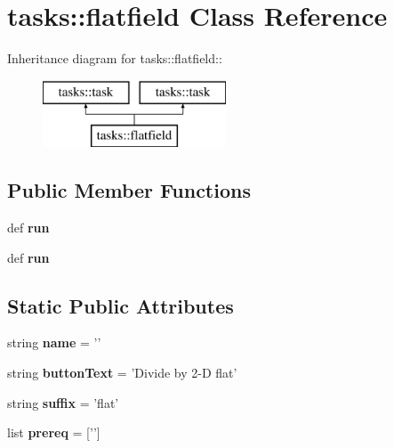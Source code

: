 \section{tasks::flatfield Class Reference}
\label{classtasks_1_1flatfield}
Inheritance diagram for tasks::flatfield::\begin{figure}[H]
\begin{center}
\leavevmode
\includegraphics[height=2cm]{classtasks_1_1flatfield}
\end{center}
\end{figure}
\subsection*{Public Member Functions}
\begin{CompactItemize}
\item 
def \textbf{run}\label{classtasks_1_1flatfield_1192e37528e19d117edb8c848d1f0dfe}

\item 
def \textbf{run}\label{classtasks_1_1flatfield_1192e37528e19d117edb8c848d1f0dfe}

\end{CompactItemize}
\subsection*{Static Public Attributes}
\begin{CompactItemize}
\item 
string \textbf{name} = '{\bfflatfield}'\label{classtasks_1_1flatfield_70eecd05a653f468f017ec9c5adc7088}

\item 
string \textbf{button\-Text} = 'Divide by 2-D flat'\label{classtasks_1_1flatfield_7d5399128a9f975eb6f00212ee217ca9}

\item 
string \textbf{suffix} = 'flat'\label{classtasks_1_1flatfield_585d924d4d2d46488922ce09b3446ebe}

\item 
list \textbf{prereq} = ['{\bfpreproc}']\label{classtasks_1_1flatfield_ad4259bdcad744f1cc6cc1ae9a4d3e2e}

\end{CompactItemize}


